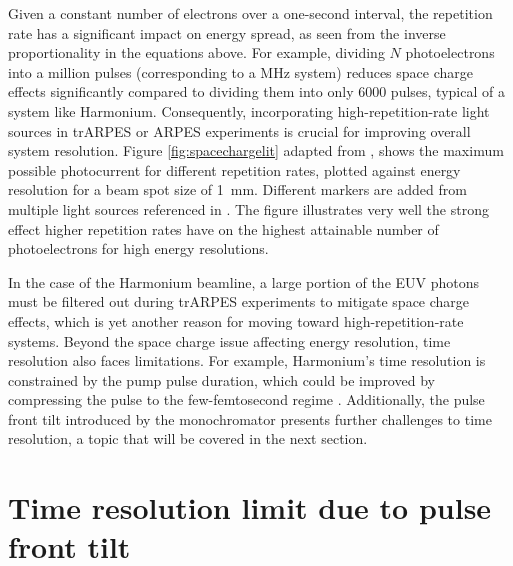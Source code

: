 Given a constant number of electrons over a one-second interval, the repetition rate has a significant impact on energy spread, as seen from the inverse proportionality in the equations above.
For example, dividing $N$ photoelectrons into a million pulses (corresponding to a \unit{\mega\hertz} system) reduces space charge effects significantly compared to dividing them into only 6000 pulses, typical of a system like Harmonium.
Consequently, incorporating high-repetition-rate light sources in trARPES or ARPES experiments is crucial for improving overall system resolution.
Figure \ref{fig:spacechargelit} adapted from \cite{corder_ultrafast_2018}, shows the maximum possible photocurrent for different repetition rates, plotted against energy resolution for a beam spot size of \qty{1}{\milli\meter}.
Different markers are added from multiple light sources referenced in \cite{corder_ultrafast_2018}.
The figure illustrates very well the strong effect higher repetition rates have on the highest attainable number of photoelectrons for high energy resolutions.

In the case of the Harmonium beamline, a large portion of the EUV photons must be filtered out during trARPES experiments to mitigate space charge effects, which is yet another reason for moving toward high-repetition-rate systems.
Beyond the space charge issue affecting energy resolution, time resolution also faces limitations.
For example, Harmonium’s time resolution is constrained by the pump pulse duration, which could be improved by compressing the pulse to the few-femtosecond regime \cite{nisoli_compression_1997}.
Additionally, the pulse front tilt introduced by the monochromator presents further challenges to time resolution, a topic that will be covered in the next section.
	
\section{Time resolution limit due to pulse front tilt}

